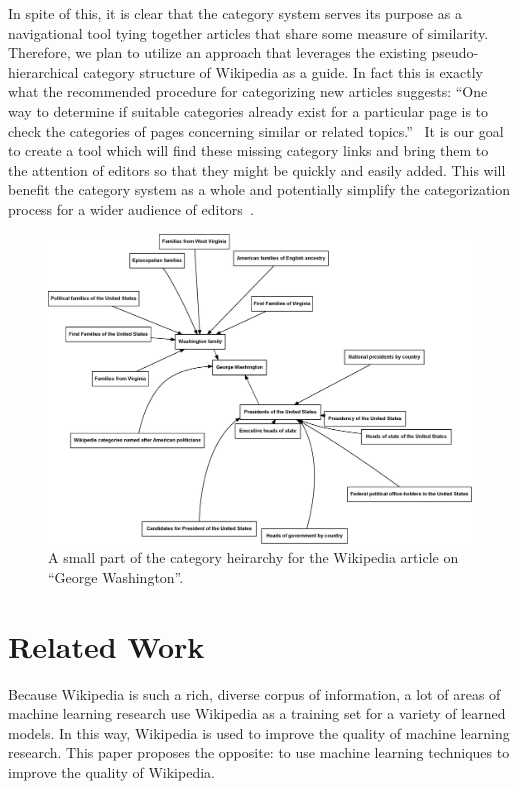 \documentclass[]{sig-alternate}
\begin{document}
In spite of this, it is clear that the category system serves its purpose as a navigational tool tying together articles that share some measure of similarity. Therefore, we plan to utilize an approach that leverages the existing pseudo-hierarchical category structure of Wikipedia as a guide. In fact this is exactly what the recommended procedure for categorizing new articles suggests: ``One way to determine if suitable categories already exist for a particular page is to check the categories of pages concerning similar or related topics.''~\cite{cattalk} It is our goal to create a tool which will find these missing category links and bring them to the attention of editors so that they might be quickly and easily added. This will benefit the category system as a whole and potentially simplify the categorization process for a wider audience of editors~\cite{Fu}.
\begin{figure}[htb!]
	\begin{center}
		\includegraphics[width=1.0\linewidth]{washington-graph}
	\end{center}
	\vspace{-12pt}
	\caption{A small part of the category heirarchy for the Wikipedia article on ``George Washington''.}
	\label{fig:washington-graph}
\end{figure}


\section{Related Work}
\label{sec:related_work}
Because Wikipedia is such a rich, diverse corpus of information, a lot of areas of machine learning research use Wikipedia as a training set for a variety of learned models. In this way, Wikipedia is used to improve the quality of machine learning research. This paper proposes the opposite: to use machine learning techniques to improve the quality of Wikipedia.
\end{document}
